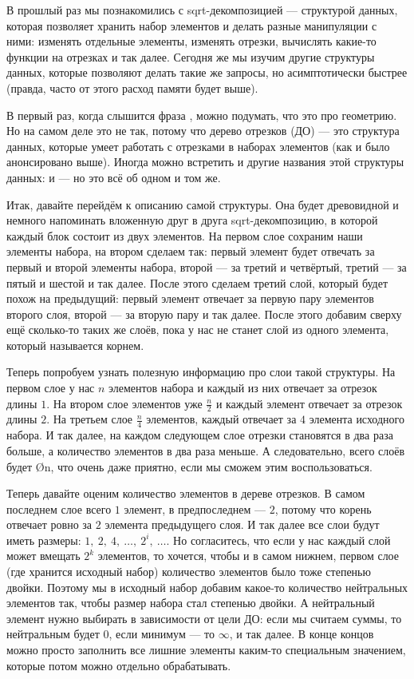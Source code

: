 В прошлый раз мы познакомились с sqrt-декомпозицией — структурой данных, которая позволяет хранить набор элементов и делать разные манипуляции с ними: изменять отдельные элементы, изменять отрезки, вычислять какие-то функции на отрезках и так далее. Сегодня же мы изучим другие структуры данных, которые позволяют делать такие же запросы, но асимптотически быстрее (правда, часто от этого расход памяти будет выше).


В первый раз, когда слышится фраза , можно подумать, что это про геометрию. Но на самом деле это не так, потому что дерево отрезков (ДО) — это структура данных, которые умеет работать с отрезками в наборах элементов (как и было анонсировано выше). Иногда можно встретить и другие названия этой структуры данных:  и  — но это всё об одном и том же.

Итак, давайте перейдём к описанию самой структуры. Она будет древовидной и немного напоминать вложенную друг в друга sqrt-декомпозицию, в которой каждый блок состоит из двух элементов. На первом слое сохраним наши элементы набора, на втором сделаем так: первый элемент будет отвечать за первый и второй элементы набора, второй — за третий и четвёртый, третий — за пятый и шестой и так далее. После этого сделаем третий слой, который будет похож на предыдущий: первый элемент отвечает за первую пару элементов второго слоя, второй — за вторую пару и так далее. После этого добавим сверху ещё сколько-то таких же слоёв, пока у нас не станет слой из одного элемента, который называется корнем.

Теперь попробуем узнать полезную информацию про слои такой структуры. На первом слое у нас $n$ элементов набора и каждый из них отвечает за отрезок длины $1$. На втором слое элементов уже $\frac{n}{2}$ и каждый элемент отвечает за отрезок длины $2$. На третьем слое $\frac{n}{4}$ элементов, каждый отвечает за $4$ элемента исходного набора. И так далее, на каждом следующем слое отрезки становятся в два раза больше, а количество элементов в два раза меньше. А следовательно, всего слоёв будет \O{\log n}, что очень даже приятно, если мы сможем этим воспользоваться.

Теперь давайте оценим количество элементов в дереве отрезков. В самом последнем слое всего $1$ элемент, в предпоследнем — $2$, потому что корень отвечает ровно за $2$ элемента предыдущего слоя. И так далее все слои будут иметь размеры: $1,\ 2,\ 4,\ \ldots,\ 2^i,\ \ldots$. Но согласитесь, что если у нас каждый слой может вмещать $2^k$ элементов, то хочется, чтобы и в самом нижнем, первом слое (где хранится исходный набор) количество элементов было тоже степенью двойки. Поэтому мы в исходный набор добавим какое-то количество нейтральных элементов так, чтобы размер набора стал степенью двойки. А нейтральный элемент нужно выбирать в зависимости от цели ДО: если мы считаем суммы, то нейтральным будет $0$, если минимум — то $\infty$, и так далее. В конце концов можно просто заполнить все лишние элементы каким-то специальным значением, которые потом можно отдельно обрабатывать.

